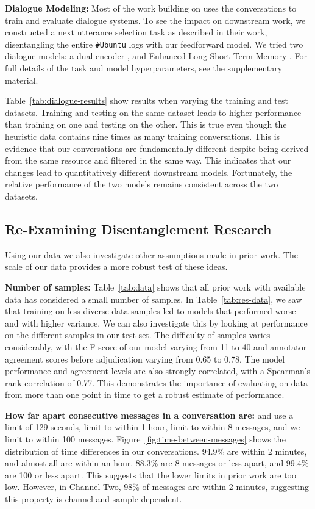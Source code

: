 \documentclass[11pt,a4paper]{article}
\newcommand{\tightparagraph}[1]{\noindent\textbf{#1:}}
\begin{document}
\tightparagraph{Dialogue Modeling}
Most of the work building on \citet{Lowe:2017:DD} uses the conversations to train and evaluate dialogue systems.
To see the impact on downstream work, we constructed a next utterance selection task as described in their work, disentangling the entire \texttt{\#Ubuntu} logs with our feedforward model.
We tried two dialogue models: a dual-encoder \citep{Lowe:2017:DD}, and Enhanced Long Short-Term Memory \citep{Chen:ACL:2017}.
For full details of the task and model hyperparameters, see the supplementary material.

Table~\ref{tab:dialogue-results} show results when varying the training and test datasets.
Training and testing on the same dataset leads to higher performance than training on one and testing on the other.
This is true even though the heuristic data contains nine times as many training conversations.
This is evidence that our conversations are fundamentally different despite being derived from the same resource and filtered in the same way.
This indicates that our changes lead to quantitatively different downstream models.
Fortunately, the relative performance of the two models remains consistent across the two datasets.

\subsection{Re-Examining Disentanglement Research} \label{sec:analysis}

Using our data we also investigate other assumptions made in prior work.
The scale of our data provides a more robust test of these ideas.

\tightparagraph{Number of samples}
Table~\ref{tab:data} shows that all prior work with available data has considered a small number of samples.
In Table~\ref{tab:res-data}, we saw that training on less diverse data samples led to models that performed worse and with higher variance.
We can also investigate this by looking at performance on the different samples in our test set.
The difficulty of samples varies considerably, with the F-score of our model varying from 11 to 40 and annotator agreement scores before adjudication varying from 0.65 to 0.78.
The model performance and agreement levels are also strongly correlated, with a Spearman's rank correlation of 0.77.
This demonstrates the importance of evaluating on data from more than one point in time to get a robust estimate of performance.

\tightparagraph{How far apart consecutive messages in a conversation are}
\citet{elsner:2008} and \citet{Mehri:2017:IJCNLP} use a limit of 129 seconds,
\citet{Jiang:NAACL:2018} limit to within 1 hour,
\citet{Guo:2017:EDB} limit to within 8 messages,
and we limit to within 100 messages.
Figure~\ref{fig:time-between-messages} shows the distribution of time differences in our conversations.
94.9\% are within 2 minutes, and almost all are within an hour.
88.3\% are 8 messages or less apart, and 99.4\% are 100 or less apart.
This suggests that the lower limits in prior work are too low.
However, in Channel Two, 98\% of messages are within 2 minutes, suggesting this property is channel and sample dependent.
\end{document}
